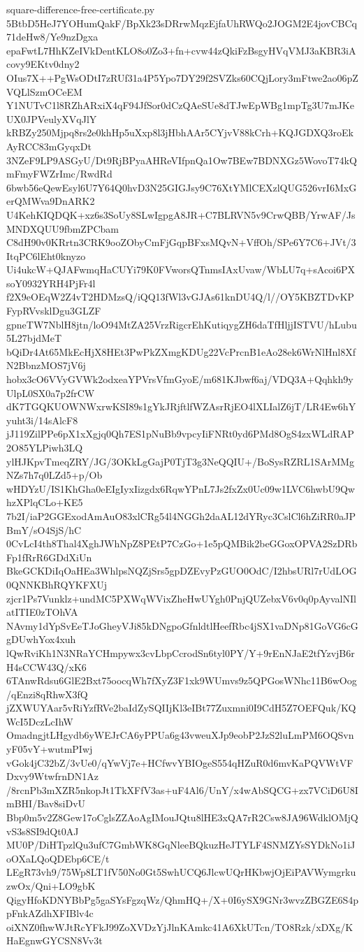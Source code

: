 \documentclass[11pt]{article}
\theoremstyle{definition}
\theoremstyle{remark}
\begin{document}
\begin{filecontents*}[overwrite]{square-difference-free-certificate.py}
5BtbD5HeJ7YOHumQakF/BpXk23sDRrwMqzEjfaUhRWQo2JOGM2E4jovCBCq71deHw8/Ye9nzDgxa
epaFwtL7HhKZeIVkDentKLO8o0Zo3+fn+cvw44zQkiFzBsgyHVqVMJ3aKBR3iAcovy9EKtv0dny2
OIus7X++PgWsODtI7zRUf31a4P5Ypo7DY29f2SVZks60CQjLory3mFtwe2ao06pZVQLlSzmOCeEM
Y1NUTvC1l8RZhARxiX4qF94JfSor0dCzQAeSUe8dTJwEpWBg1mpTg3U7mJKeUX0JPVeulyXVqJlY
kRBZy250Mjpq8rs2e0khHp5uXxp8l3jHbhAAr5CYjvV88kCrh+KQJGDXQ3roEkAyRCC83mGyqxDt
3NZeF9LP9ASGyU/Dt9RjBPyaAHReVIfpnQa1Ow7BEw7BDNXGz5WovoT74kQmFmyFWZrImc/RwdRd
6bwb56eQewEsyl6U7Y64Q0hvD3N25GIGJsy9C76XtYMlCEXzlQUG526vrI6MxGerQMWva9DnARK2
U4KehKIQDQK+xz6s3SoUy8SLwIgpgA8JR+C7BLRVN5v9CrwQBB/YrwAF/JsMNDXQUU9fbmZPCbam
C8dH90v0KRrtn3CRK9ooZObyCmFjGqpBFxsMQvN+VffOh/SPe6Y7C6+JVt/3ItqPC6lEht0knyzo
Ui4ukcW+QJAFwmqHaCUYi79K0FVworsQTnmsIAxUvaw/WbLU7q+sAcoi6PXsoY0932YRH4PjFr4l
f2X9eOEqW2Z4vT2HDMzsQ/iQQ13fWl3vGJAs61knDU4Q/l//OY5KBZTDvKPFypRVvsklDgu3GLZF
gpneTW7NblH8jtn/loO94MtZA25VrzRigcrEhKutiqygZH6daTfHljjISTVU/hLubu5L27bjdMeT
bQiDr4At65MkEcHjX8HEt3PwPkZXmgKDUg22VcPrcnB1eAo28ek6WrNlHnl8XfN2BbnzMOS7jV6j
hobx3cO6VVyGVWk2odxeaYPVrsVfmGyoE/m681KJbwf6aj/VDQ3A+Qqhkh9yUlpL0SX0a7p2frCW
dK7TGQKUOWNWxrwKSI89s1gYkJRjftlfWZAsrRjEO4lXLIalZ6jT/LR4Ew6hYyuht3i/14sAlcF8
jJ119ZilPPe6pX1xXgjq0Qh7ES1pNuBb9vpcyIiFNRt0yd6PMd8OgS4zxWLdRAP2O85YLPiwh3LQ
ylHJKpvTmeqZRY/JG/3OKkLgGajP0TjT3g3NeQQIU+/BoSysRZRL1SArMMgNZs7h7q0LZd5+p/Ob
wHDYzU/IS1KhGha0eEIgIyxIizgdx6RqwYPnL7Js2fxZx0Uc09w1LVC6hwbU9QwhzXPlqCLo+KE5
7b2I/iaP2GGExodAmAuO83xlCRg54l4NGGh2daAL12dYRyc3CslCl6hZiRR0aJPBmY/sO4SjS/hC
0CvLcI4th8Thal4XghJWhNpZ8PEtP7CzGo+1e5pQMBik2beGGoxOPVA2SzDRbFp1fRrR6GDdXiUn
BkeGCKDiIqOaHEa3WhlpsNQZjSrs5gpDZEvyPzGUO0OdC/I2hbsURl7rUdLOG0QNNKBhRQYKFXUj
zjcr1Ps7Vunklz+undMC5PXWqWVixZheHwUYgh0PnjQUZebxV6v0q0pAyvalNIlatITIE0zTOhVA
NAvmy1dYpSvEeTJoGheyVJi85kDNgpoGfnldtlHeefRbc4jSX1vaDNp81GoVG6cGgDUwhYox4xuh
lQwRviKh1N3NRaYCHmpywx3cvLbpCcrodSn6tyl0PY/Y+9rEnNJaE2tfYzvjB6rH4sCCW43Q/xK6
6TAnwRdsu6GlE2Bxt75oocqWh7fXyZ3F1xk9WUmvs9z5QPGosWNhc11B6wOog/qEnzi8qRhwX3fQ
jZXWUYAar5vRiYzfRVe2baIdZySQIIjKl3eIBt77Zuxmni0I9CdH5Z7OEFQuk/KQWcI5DczLcIhW
OmadngjtLHgydb6yWEJrCA6yPPUa6g43vweuXJp9eobP2JzS2luLmPM6OQSvnyF05vY+wutmPIwj
vGok4jC32bZ/3vUe0/qYwVj7e+HCfwvYBIOgeS554qHZuR0d6mvKaPQVWtVFDxvy9WtwfrnDN1Az
/8rcnPb3mXZR5nkopJt1TkXFfV3as+uF4Al6/UnY/x4wAbSQCG+zx7VCiD6U8ImBHI/Bav8siDvU
Bbp0m5v2Z8Gew17oCglsZZAoAgIMouJQtu8lHE3xQA7rR2Csw8JA96WdklOMjQvS3s8SI9dQt0AJ
MU0P/DiHTpzlQu3ufC7GmbWK8GqNleeBQkuzHeJTYLF4SNMZYsSYDkNo1iJoOXaLQoQDEbp6CE/t
LEgR73vh9/75Wp8LT1fV50No0Gt5SwhUCQ6JlcwUQrHKbwjOjEiPAVWymgrkuzwOx/Qni+LO9gbK
QigyHfoKDNYBbPg5gaSYsFgzqWz/QhmHQ+/X+0I6ySX9GNr3wvzZBGZE6S4ppFnkAZdhXFIBlv4c
oiXNZ0fhwWJtRcYFkJ99ZoXVDzYjJlnKAmkc41A6XkUTcn/TO8Rzk/xDXg/KHaEgnwGYCSN8Vv3t

\end{filecontents*}
\end{document}
